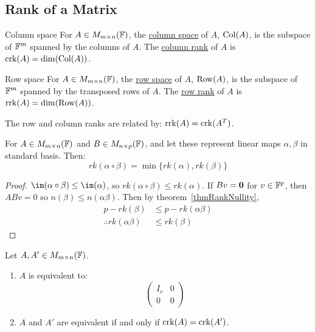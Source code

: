 \documentclass[../Main.tex]{subfiles}
\begin{document}
\subsection{Rank of a Matrix}
\begin{definition}{Column space}
    For $A \in M_{m \times n}(\mathbb{F})$, the \underline{column space} of $A$, $\operatorname{Col}(A)$, is the subspace of $\mathbb{F}^m$ spanned by the columns of $A$. The \underline{column rank} of $A$ is $\operatorname{crk}(A) = \dim(\operatorname{Col}(A))$.
\end{definition}
\begin{definition}{Row space}
    For $A \in M_{m \times n}(\mathbb{F})$, the \underline{row space} of $A$, $\operatorname{Row}(A)$, is the subspace of $\mathbb{F}^m$ spanned by the transposed rows of $A$. The \underline{row rank} of $A$ is $\operatorname{rrk}(A) = \dim(\operatorname{Row}(A))$.
\end{definition}
The row and column ranks are related by: $\operatorname{rrk}(A) = \operatorname{crk}(A^T)$.
\begin{lemma}
    For $A \in M_{m \times n}(\mathbb{F})$ and $B \in M_{n \times p}(\mathbb{F})$, and let these represent linear maps $\alpha, \beta$ in standard basis. Then:
    \begin{equation*}
        rk(\alpha \circ \beta) = \min\{rk(\alpha), rk(\beta)\}
    \end{equation*}
    \label{lemRankOfProduct}
\end{lemma}
\begin{proof}
    $\im(\alpha \circ \beta) \leq \im(\alpha)$, so $rk(\alpha \circ \beta) \leq rk(\alpha)$. If $Bv = \boldsymbol{0}$ for $v \in \mathbb{F}^p$, then $ABv = 0$ so $n(\beta) \leq n(\alpha\beta)$. Then by theorem~\ref{thmRankNullity},
    \begin{align*}
        p - rk(\beta) &\leq p - rk(\alpha\beta) \\
        \therefore rk(\alpha\beta) &\leq rk(\beta)
    \end{align*}
\end{proof}
\begin{theorem}
    Let $A, A' \in M_{m \times n}(\mathbb{F})$.
    \begin{enumerate}
        \item $A$ is equivalent to:
        \begin{equation*}
            \begin{pmatrix}
                I_r & 0 \\
                0 & 0
            \end{pmatrix}
        \end{equation*}
        \item $A$ and $A'$ are equivalent if and only if $\operatorname{crk}(A) = \operatorname{crk}(A')$.
    \end{enumerate}
    \label{thmMatEquivClasses}
\end{theorem}
\end{document}
